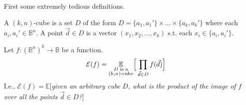 First some extremely tedious definitions.
\pause
\begin{definition}[$(k, n)$-Cube]
A $(k, n)$-cube is a set $D$ of the form
\(D = \{ a_1, a_1' \} \times ... \times \{ a_k, a_k' \}\)
where each $a_i, a_i' \in \mathbb{B}^n$.
A point $\vec{d} \in D$ is a vector $(x_1, x_2, ..., x_k)$ s.t. each $x_i \in \{ a_i, a_i' \}$.
\end{definition}
\pause
\begin{definition}[$\mathcal{E}$]
Let $f : (\mathbb{B}^n)^k \to \mathbb{B}$ be a function.
\[\mathcal{E}(f) = \underset{\substack{D \text{ is a}\\(k, n)\text{-cube}}}{{\LARGE \mathbb{E}}} \Big[\prod_{\vec{d} \in D} f(\vec{d}) \Big]\]
I.e., $\mathcal{E}(f) = \mathbb{E}[$\emph{given an arbitrary cube $D$, what is the product of the image of $f$ over all the points $\vec{d} \in D$?}$]$
\end{definition}